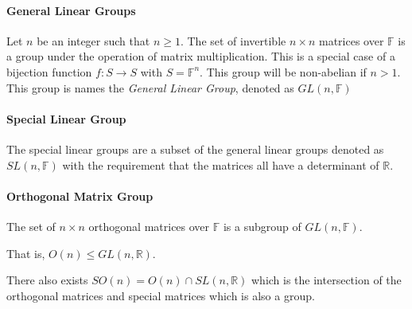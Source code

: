 \paragraph{General Linear Groups}
Let \(n\) be an integer such that \(n \geq 1\). The set of invertible
\(n\times n\) matrices over \(\mathbb{F}\) is a group under the operation
of matrix multiplication.
This is a special case of a bijection function \(f: S\to S\) with
\(S = \mathbb{F}^n\). This group will be non-abelian if \(n > 1\).
This group is names the \textit{General Linear Group}, denoted as
\(GL(n, \mathbb{F})\)

\paragraph{Special Linear Group}
The special linear groups are a subset of the general linear groups
denoted as \(SL(n, \mathbb{F})\) with the requirement that the matrices
all have a determinant of \(\mathbb{R}\).

\paragraph{Orthogonal Matrix Group}
The set of \(n\times n\) orthogonal matrices over \(\mathbb{F}\) is a subgroup of 
\(GL(n, \mathbb{F})\).

That is, \(O(n) \leq GL(n, \mathbb{R})\).

There also exists \(SO(n) = O(n) \cap SL(n, \mathbb{R})\) which is the
intersection of the orthogonal matrices and special matrices which is also
a group.

